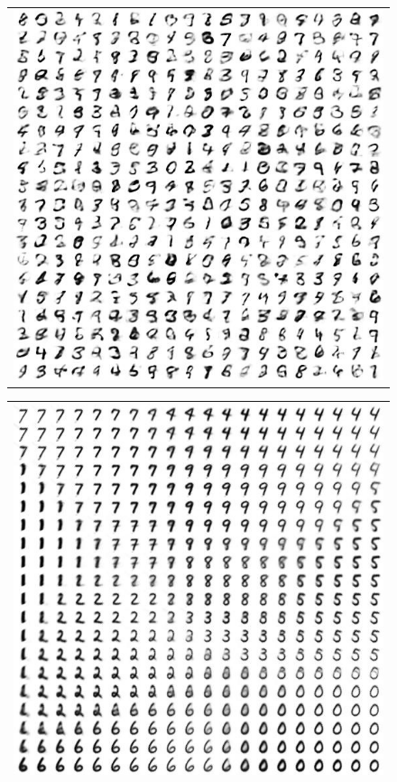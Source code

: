 \documentclass[letterpaper, twoside]{article}
\begin{document}
\begin{figure}[H]
\begin{minipage}{.33\textwidth}
\begin{flushleft}
\begin{tabular}{|@{}c@{}|}
\includegraphics[scale=0.5]{manifold_20.jpg}\\
\end{tabular}
\end{flushleft}
\end{minipage}%
\begin{minipage}{.33\textwidth}
\begin{tabular}{|@{}c@{}|}
\includegraphics[scale=0.5]{manifold_26.jpg}\\ \hline

\end{tabular}
\end{minipage}
\end{figure}
\end{document}

